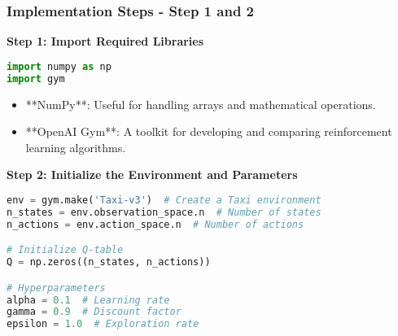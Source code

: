 \documentclass{beamer}
\begin{document}
\begin{frame}[fragile]
    \frametitle{Implementation Steps - Step 1 and 2}
    \textbf{Step 1: Import Required Libraries}
    \begin{lstlisting}[language=Python]
import numpy as np
import gym
    \end{lstlisting}
    \begin{itemize}
        \item **NumPy**: Useful for handling arrays and mathematical operations.
        \item **OpenAI Gym**: A toolkit for developing and comparing reinforcement learning algorithms.
    \end{itemize}
    
    \textbf{Step 2: Initialize the Environment and Parameters}
    \begin{lstlisting}[language=Python]
env = gym.make('Taxi-v3')  # Create a Taxi environment
n_states = env.observation_space.n  # Number of states
n_actions = env.action_space.n  # Number of actions

# Initialize Q-table
Q = np.zeros((n_states, n_actions))

# Hyperparameters
alpha = 0.1  # Learning rate
gamma = 0.9  # Discount factor
epsilon = 1.0  # Exploration rate
    \end{lstlisting}
\end{frame}
\end{document}
